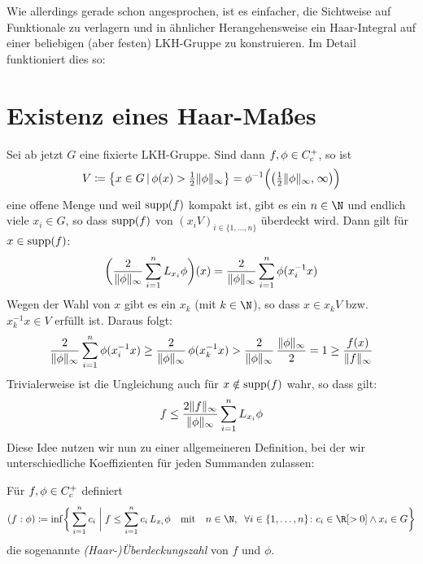 Wie allerdings gerade schon angesprochen, ist es einfacher, die Sichtweise auf
Funktionale zu verlagern und in ähnlicher Herangehensweise ein Haar-Integral auf
einer beliebigen (aber festen) LKH-Gruppe zu konstruieren. Im Detail
funktioniert dies so:


\section{Existenz eines Haar-Maßes}
Sei ab jetzt $G$ eine fixierte LKH-Gruppe. Sind dann $f,\phi\in C_c^+$,
so ist 
\[ V \defeq \bigl\{ x \in G \Mid \phi(x) > \thalf\supnorm\phi \bigr\} 
      = \phi^{-1}\Bigl( \bigl( \thalf\supnorm\phi, \mkern2mu\infty\bigr) \Bigr)
\]
eine offene Menge und weil $\operatorname{supp}(f)$ kompakt ist, gibt es ein $n\in\N$ und 
endlich viele $x_i\in G$, so dass $\operatorname{supp}(f)$ von $(x_iV)_{i\in\{1,\ldots,n\}}$ 
überdeckt wird. Dann gilt für $x\in\operatorname{supp}(f)$:
\[
    \biggl( \frac{2}{\lVert\phi\rVert_\infty} \sum_{i=1}^n L_{x_i}\phi \biggr)(x)
    = \frac{2}{\lVert\phi\rVert_\infty} \sum_{i=1}^n \phi(x_i^{-1}x)
\]
Wegen der Wahl von $x$ gibt es ein $x_k$ (mit $k\in\N$), so
dass $x\in x_kV$ bzw. $x_k^{-1}x\in V$ erfüllt ist. Daraus folgt:
\[  
    \frac{2}{\lVert\phi\rVert_\infty} \sum_{i=1}^n \phi(x_i^{-1}x)
    \geq \frac{2}{\lVert\phi\rVert_\infty} \, \phi(x_k^{-1}x)
    > \frac{2}{\lVert\phi\rVert_\infty} \, \frac{\lVert\phi\rVert_\infty}{2} 
    = 1 \geq \frac{f(x)}{\lVert f\rVert_\infty}
\]
Trivialerweise ist die Ungleichung auch für $x\notin\operatorname{supp}(f)$ wahr, so dass
gilt:
\[  f \leq \frac{2\lVert f\rVert_\infty}{\lVert\phi\rVert_\infty} \sum_{i=1}^n L_{x_i}\phi  \]
Diese Idee nutzen wir nun zu einer allgemeineren Definition, bei der wir
unterschiedliche Koeffizienten für jeden Summanden zulassen:

\begin{thDef}
    \label{pf:def:covernum}
    Für $f,\phi \in C_c^+$ definiert
    \[
        (f : \phi) \defeq 
        \inf \biggl\{\, \sum_{i=1}^n c_i  \cMid[\;]{\bigg} 
                     f \leq \sum_{i=1}^n c_i \, L_{x_i}\phi 
                     \qtextq{mit} n\in\N, \;\;
                     \forall i\in\{1,\ldots,n\}\colon 
                     c_i\in\R[>0] \wedge x_i\in G
            \biggr\}
    \]
    die sogenannte \emph{(Haar-)Überdeckungszahl} von $f$ und $\phi$.
\end{thDef}

